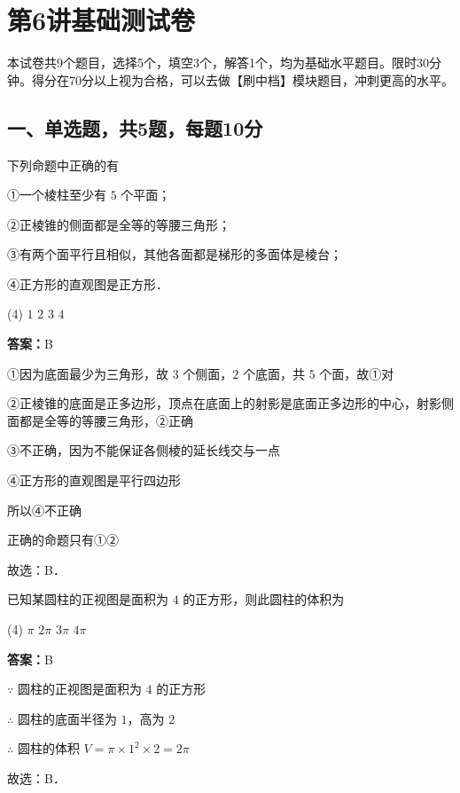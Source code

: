 \section{第6讲\quad 基础测试卷}

本试卷共9个题目，选择5个，填空3个，解答1个，均为基础水平题目。限时30分钟。得分在70分以上视为合格，可以去做【刷中档】模块题目，冲刺更高的水平。

\subsection{一、单选题，共5题，每题10分}

\begin{example}[\bkstar{1}{5}]
下列命题中正确的有

①一个棱柱至少有 $5$ 个平面；

②正棱锥的侧面都是全等的等腰三角形；

③有两个面平行且相似，其他各面都是梯形的多面体是棱台；

④正方形的直观图是正方形．
\begin{tasks}(4)
    \task $1$
    \task $2$
    \task $3$
    \task $4$
\end{tasks}
\end{example}
\begin{solution}
\textbf{答案：}B

①因为底面最少为三角形，故 $3$ 个侧面，$2$ 个底面，共 $5$ 个面，故①对

②正棱锥的底面是正多边形，顶点在底面上的射影是底面正多边形的中心，射影侧面都是全等的等腰三角形，②正确

③不正确，因为不能保证各侧棱的延长线交与一点

④正方形的直观图是平行四边形

所以④不正确

正确的命题只有①②

故选：B．
\end{solution}

\vspace{2em}

\begin{example}[\bkstar{1}{5}]
已知某圆柱的正视图是面积为 $4$ 的正方形，则此圆柱的体积为
\begin{tasks}(4)
    \task $\pi$
    \task $2\pi$
    \task $3\pi$
    \task $4\pi$
\end{tasks}
\end{example}
\begin{solution}
\textbf{答案：}B

$\because$ 圆柱的正视图是面积为 $4$ 的正方形

$\therefore$ 圆柱的底面半径为 $1$，高为 $2$

$\therefore$ 圆柱的体积 $V=\pi\times 1^2\times 2=2\pi$

故选：B．
\end{solution}

